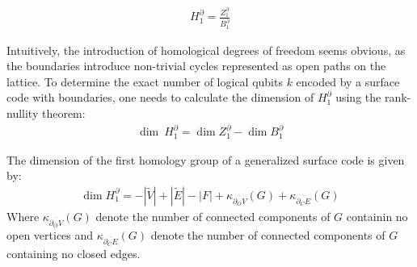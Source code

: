 \documentclass[12pt, twoside, openany]{book}
\begin{document}
\begin{align}
    H_1^\partial = \frac{Z_1^\partial}{B_1^\partial}
\end{align}

Intuitively, the introduction of homological degrees of freedom seems obvious, as the boundaries introduce non-trivial cycles represented as open paths on the lattice. To determine the exact number of logical qubits $k$ encoded by a surface code with boundaries, one needs to calculate the dimension of $H_1^{\partial}$ using the rank-nullity theorem:
\begin{align} \label{dimHZB}
    \dim \ H_1^\partial = \dim  Z_1^\partial - \dim  B_1^\partial
\end{align}

\begin{proposition} \label{dim_surface_code}
    The dimension of the first homology group of a generalized surface code is given by:
    \begin{align}
    \dim H_1^\partial =-|\tilde{V}| + |\tilde{E}| - |F| + \kappa_{\overline{\partial_O V}}(G) + \kappa_{\overline{\partial_C E}}(G)
    \end{align}
    Where $\kappa_{\overline{\partial_O V}}(G)$ denote the number of connected components of $G$ containin no open vertices and $\kappa_{\overline{\partial_C E}}(G)$ denote the number of connected components of $G$ containing no closed edges.
\end{proposition}
\end{document}
